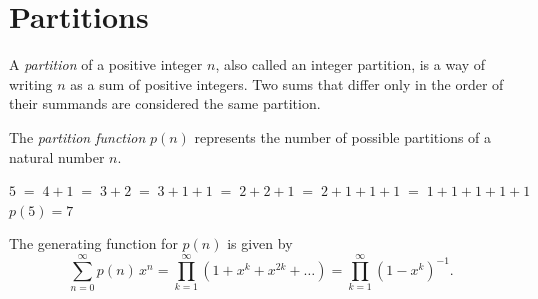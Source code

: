 %

\renewcommand{\thefootnote}{\arabic{footnote}}
\newcommand{\R}{\mathbb{R}}
\newcommand{\Q}{\mathbb{Q}}
\newcommand{\N}{\mathbb{N}}
\newcommand{\Z}{\mathbb{Z}}
\newcommand{\C}{\mathbb{C}}
\newcommand{\h}{\mathbb{H}}



\section{Partitions}

\begin{definition}
   A \emph{partition} of a positive integer $n$, also called an integer partition, is a way of writing $n$ as a sum of positive integers. Two sums that differ only in the order of their summands are considered the same partition.

   The \emph{partition function} $p(n)$ represents the number of possible partitions of a natural number $n$.
\end{definition}

\begin{example}
$5\;=\;4+1\;=\;3+2\;=\;3+1+1\;=\;2+2+1\;=\;2+1+1+1\;=\;1+1+1+1+1$\\
$p(5)=7$
\end{example}

\begin{lemma}
The generating function for $p(n)$ is given by
$$\sum_{n=0}^\infty p(n)\,x^n=\prod_{k=1}^\infty(1+x^k+x^{2k}+\ldots)=\prod_{k=1}^{\infty}(1-x^k)^{-1}.$$
\end{lemma}

